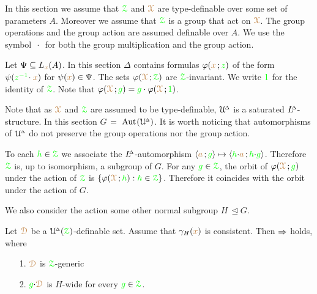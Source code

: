 In this section we assume that $\grZ$ and $\mrX$ are type-definable over some set of parameters $A$.
Moreover we assume that $\grZ$ is a group that act on $\mrX$.
The group operations and the group action are assumed definable over $A$.
We use the symbol $\,\cdot\,$ for both the group multiplication and the group action.

Let $\Psi\subseteq L_{\mr x}(A)$.
In this section $\Delta$ contains formulas $\phi({\mr x}\,;{\gr z})$ of the form  $\psi({\gr z^{-1}}\!\cdot{\mr x})$ for $\psi({\mr x})\in\Psi$.
The sets $\phi(\mrX\,;\grZ)$ are $\grZ$-invariant.
We write ${\gr 1}$ for the identity of $\grZ$.
Note that $\phi(\mrX\,;{\gr g})={\gr g}\cdot\phi(\mrX\,;{\gr 1})$.

Note that as $\mrX$ and $\grZ$ are assumed to be type-definable, $\UDelta$ is a saturated $\LDelta$-structure.
In this section \emph{$G$}$~=~\Aut(\UDelta)$.
It is worth noticing that automorphisms of $\UDelta$ do not preserve the group operations nor the group action.

To each ${\gr h}\in\grZ$ we associate the $\LDelta$-automorphism $\<{\mr a}\,;{\gr g}\>\mapsto\<{\gr h}{\cdot}{\mr a}\,;{\gr h}{\cdot}{\gr g}\>$.
Therefore $\grZ$ is, up to isomorphism, a subgroup of $G$.
For any ${\gr g}\in\grZ$, the orbit of $\phi(\mrX\,;{\gr g})$ under the action of $\grZ$ is $\{\phi(\mrX\,;{\gr h}) : {\gr h}\in\grZ\}$.
Therefore it coincides with the orbit under the action of $G$.


We also consider the action some other normal subgroup \emph{$H$\/}$\,\trianglelefteq G$.

\def\medrel#1{\parbox[t]{5ex}{$\displaystyle\hfil #1$}}
\def\ceq#1#2#3{\parbox[t]{6ex}{$\displaystyle #1$}\medrel{#2}{$\displaystyle #3$}}

\begin{proposition}\label{prop_Ggeneric_persistent}
  Let $\mrD$ be a $\UDelta(\grZ)$-definable set.
  Assume that $\gamma_H({\mr x})$ is consistent.
  Then $\IMP$ holds, where
  \begin{itemize}
    \item [1.] $\mrD$ is $\grZ$-generic
    \item [2.] ${\gr g}{\cdot}\mrD$ is $H$-wide for every ${\gr g}\in\grZ$.
  \end{itemize}
\end{proposition}

